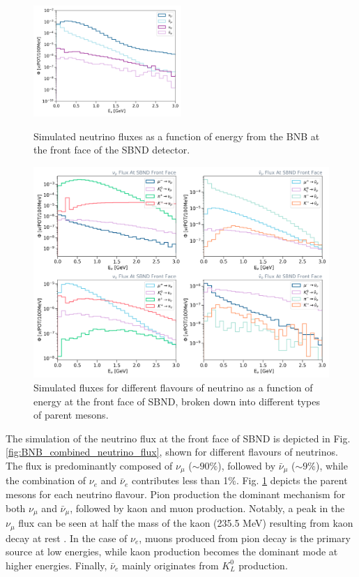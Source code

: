 \begin{figure}[tbp] 
\centering    
\includegraphics[width=0.5\textwidth]{BNB_combined_neutrino_flux}
\caption[BNB_combined_neutrino_flux]{
Simulated neutrino fluxes as a function of energy from the BNB at the front face of the SBND detector. 
}
\label{fig:BNB_combined_neutrino_flux}
\hfill
\centering    
\includegraphics[width=1.0\textwidth]{BNB_neutrino_flux}
\caption[BNB_neutrino_flux]{
Simulated fluxes for different flavours of neutrino as a function of energy at the front face of SBND, broken down into different types of parent mesons.
}
\label{fig:BNB_neutrino_flux}
\end{figure}

The simulation of the neutrino flux at the front face of SBND is depicted in Fig. \ref{fig:BNB_combined_neutrino_flux}, shown for different flavours of neutrinos. 
The flux is predominantly composed of $\nu_{\mu}$ ($\sim90\%$), followed by $\bar{\nu}_{\mu}$ ($\sim9\%$), while the combination of $\nu_{e}$ and $\bar{\nu}_{e}$ contributes less than 1\%.
Fig. \ref{fig:BNB_neutrino_flux} depicts the parent mesons for each neutrino flavour.
Pion production the dominant mechanism for both $\nu_{\mu}$ and $\bar{\nu}_{\mu}$, followed by kaon and muon production. 
Notably, a peak in the $\nu_{\mu}$ flux can be seen at half the mass of the kaon (235.5 MeV) resulting from kaon decay at rest \cite{kaonDecayNu}.
In the case of $\nu_{e}$, muons produced from pion decay is the primary source at low energies, while kaon production becomes the dominant mode at higher energies. 
Finally, $\bar{\nu}_{e}$ mainly originates from $K^{0}_{L}$ production.


